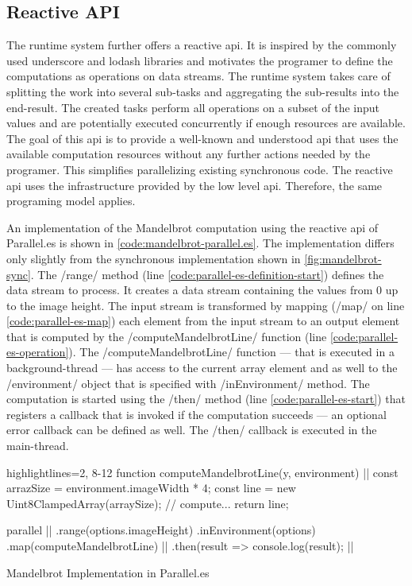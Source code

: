 \subsection{Reactive API}
The runtime system further offers a reactive api. It is inspired by the commonly used underscore and lodash libraries and motivates the programer to define the computations as operations on data streams. The runtime system takes care of splitting the work into several sub-tasks and aggregating the sub-results into the end-result. The created tasks perform all operations on a subset of the input values and are potentially executed concurrently if enough resources are available. The goal of this api is to provide a well-known and understood api that uses the available computation resources without any further actions needed by the programer. This simplifies parallelizing existing synchronous code. The reactive api uses the infrastructure provided by the low level api. Therefore, the same programing model applies.


 An implementation of the Mandelbrot computation using the reactive api of Parallel.es is shown in \cref{code:mandelbrot-parallel.es}. The implementation differs only slightly from the synchronous implementation shown in \cref{fig:mandelbrot-sync}. The \javascriptinline/range/ method (line \ref{code:parallel-es-definition-start}) defines the data stream to process. It creates a data stream containing the values from 0 up to the image height. The input stream is transformed by mapping (\javascriptinline/map/ on line \ref{code:parallel-es-map}) each element from the input stream to an output element that is computed by the \javascriptinline/computeMandelbrotLine/ function (line \ref{code:parallel-es-operation}). The \javascriptinline/computeMandelbrotLine/ function --- that is executed in a background-thread --- has access to the current array element and as well to the \javascriptinline/environment/ object that is specified with \javascriptinline/inEnvironment/ method. The computation is started using the \javascriptinline/then/ method (line \ref{code:parallel-es-start}) that registers a callback that is invoked if the computation succeeds --- an optional error callback can be defined as well. The \javascriptinline/then/ callback is executed in the main-thread.

\begin{listing}
	\begin{javascriptcode*}{highlightlines={2, 8-12}}
function computeMandelbrotLine(y, environment) { |$\label{code:parallel-es-operation}$|
	const arrazSize = environment.imageWidth * 4;
	const line = new Uint8ClampedArray(arraySize);
	// compute...
	return line;
}

parallel      |$\label{code:parallel-es-definition-start}$|
	.range(options.imageHeight)
	.inEnvironment(options)
	.map(computeMandelbrotLine) |$\label{code:parallel-es-map}$|
	.then(result => console.log(result); |$\label{code:parallel-es-start}$|
	\end{javascriptcode*}
	
	\caption{Mandelbrot Implementation in Parallel.es}
	\label{code:mandelbrot-parallel.es}
\end{listing}


